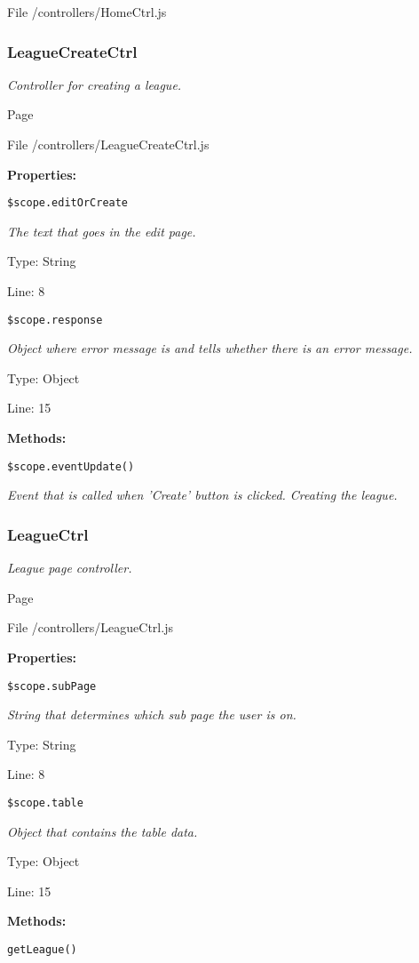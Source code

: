File /controllers/HomeCtrl.js

\subsubsection{LeagueCreateCtrl}
\textit{Controller for creating a league.}

Page \pageref{LeagueCreateCtrl.js}

File /controllers/LeagueCreateCtrl.js

\textbf{Properties:}

\texttt{\$scope.editOrCreate}

{\scriptsize
\textit{The text that goes in the edit page.}

Type: String

Line: 8

}
\texttt{\$scope.response}

{\scriptsize
\textit{Object where error message is and tells whether there is an error message.}

Type: Object

Line: 15

}
\textbf{Methods:}

\texttt{\$scope.eventUpdate()}

{\scriptsize
\textit{Event that is called when 'Create' button is clicked.
Creating the league.}

}

\subsubsection{LeagueCtrl}
\textit{League page controller.}

Page \pageref{LeagueCtrl.js}

File /controllers/LeagueCtrl.js

\textbf{Properties:}

\texttt{\$scope.subPage}

{\scriptsize
\textit{String that determines which sub page the user is on.}

Type: String

Line: 8

}
\texttt{\$scope.table}

{\scriptsize
\textit{Object that contains the table data.}

Type: Object

Line: 15

}
\textbf{Methods:}

\texttt{getLeague()}


